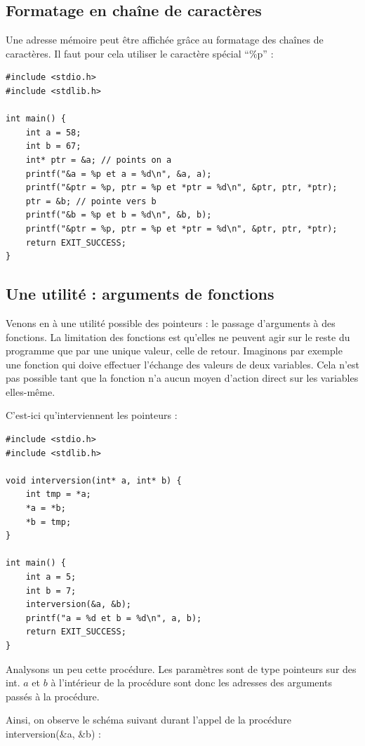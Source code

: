 \documentclass[../../../main.tex]{subfiles}
\begin{document}
\subsection{Formatage en chaîne de caractères}
Une adresse mémoire peut être affichée grâce au formatage des chaînes de caractères. Il faut pour cela utiliser le caractère spécial ``\%p'' :
\begin{verbatim}
#include <stdio.h>
#include <stdlib.h>

int main() {
	int a = 58;
	int b = 67;
	int* ptr = &a; // points on a
	printf("&a = %p et a = %d\n", &a, a);
	printf("&ptr = %p, ptr = %p et *ptr = %d\n", &ptr, ptr, *ptr);
	ptr = &b; // pointe vers b
	printf("&b = %p et b = %d\n", &b, b);
	printf("&ptr = %p, ptr = %p et *ptr = %d\n", &ptr, ptr, *ptr);
	return EXIT_SUCCESS;
}
\end{verbatim}
\subsection{Une utilité : arguments de fonctions}
Venons en à une utilité possible des pointeurs : le passage d'arguments à des fonctions. La limitation des fonctions est qu'elles ne peuvent agir sur le reste du programme que par une unique valeur, celle de retour. Imaginons par exemple une fonction qui doive effectuer l'échange des valeurs de	deux variables. Cela n'est pas possible tant que la fonction n'a aucun moyen d'action direct sur les variables elles-même.
 
C'est-ici qu'interviennent les pointeurs :
\begin{verbatim}
#include <stdio.h>
#include <stdlib.h>

void interversion(int* a, int* b) {
	int tmp = *a;
	*a = *b;
	*b = tmp;
}

int main() {
	int a = 5;
	int b = 7;
	interversion(&a, &b);
	printf("a = %d et b = %d\n", a, b);
	return EXIT_SUCCESS;
}
\end{verbatim}
Analysons un peu cette procédure. Les paramètres sont de type pointeurs sur des \textsf{int}. $a$ et $b$ à l'intérieur de la procédure sont donc les adresses des arguments passés à la procédure.
 
Ainsi, on observe le schéma suivant durant l'appel de la procédure \textsf{interversion(\&a, \&b)} :  

\begin{minipage}{\textwidth}
	\begin{center}
		
	\end{center}
\end{minipage}
 
\end{document}
